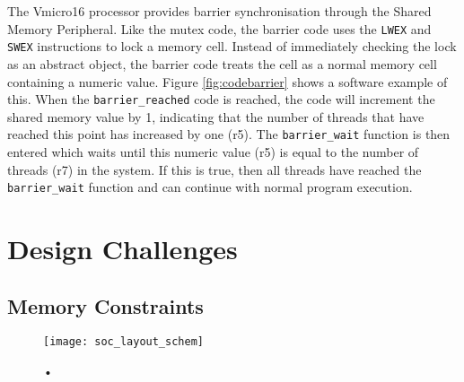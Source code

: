 The Vmicro16 processor provides barrier synchronisation through the Shared Memory Peripheral. Like the mutex code, the barrier code uses the \verb|LWEX| and \verb|SWEX| instructions to lock a memory cell. Instead of immediately checking the lock as an abstract object, the barrier code treats the cell as a normal memory cell containing a numeric value. Figure \ref{fig:codebarrier} shows a software example of this. When the \verb|barrier_reached| code is reached, the code will increment the shared memory value by 1, indicating that the number of threads that have reached this point has increased by one (r5). The \verb|barrier_wait| function is then entered which waits until this numeric value (r5) is equal to the number of threads (r7) in the system. If this is true, then all threads have reached the \verb|barrier_wait| function and can continue with normal program execution.

\section{Design Challenges}
\subsection{Memory Constraints}


\begin{figure}[H]
\centering
\texttt{[image: soc\_layout\_schem]}
\caption{•}
\label{}
\end{figure}